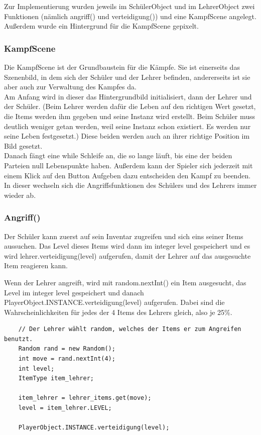 Zur Implementierung wurden jeweils im SchülerObject und im LehrerObject zwei Funktionen (nämlich angriff() und verteidigung()) und eine KampfScene angelegt.\\
Außerdem wurde ein Hintergrund für die KampfScene gepixelt.\\

\subsubsection{KampfScene}

Die KampfScene ist der Grundbaustein für die Kämpfe. Sie ist einerseits das Szenenbild, in dem sich der Schüler und der Lehrer befinden, andererseits ist sie aber auch zur Verwaltung des Kampfes da.\\
Am Anfang wird in dieser das Hintergrundbild initialisiert, dann der Lehrer und der Schüler. (Beim Lehrer werden dafür die Leben auf den richtigen Wert gesetzt, die Items werden ihm gegeben und seine Instanz wird erstellt. Beim Schüler muss deutlich weniger getan werden, weil seine Instanz schon existiert. Es werden nur seine Leben festgesetzt.) Diese beiden werden auch an ihrer richtige Position im Bild gesetzt.\\
Danach fängt eine while Schleife an, die so lange läuft, bis eine der beiden Parteien null Lebenspunkte haben. Außerdem kann der Spieler sich jederzeit mit einem Klick auf den Button \glqq Aufgeben \grqq dazu entscheiden den Kampf zu beenden.\\
In dieser wechseln sich die Angriffsfunktionen des Schülers und des Lehrers immer wieder ab.

\subsubsection{Angriff()}

Der Schüler kann zuerst auf sein Inventar zugreifen und sich eins seiner Items aussuchen. Das Level dieses Items wird dann im integer level gespeichert und es wird lehrer.verteidigung(level) aufgerufen, damit der Lehrer auf das ausgesuchte Item reagieren kann.\par
Wenn der Lehrer angreift, wird mit random.nextInt() ein Item ausgesucht, das Level im integer level gespeichert und danach PlayerObject.INSTANCE.verteidigung(level) aufgerufen. Dabei sind die Wahrscheinlichkeiten für jedes der 4 Items des Lehrers gleich, also je 25\%.
\begin{lstlisting}
	// Der Lehrer wählt random, welches der Items er zum Angreifen benutzt. 
	Random rand = new Random();
	int move = rand.nextInt(4);
	int level;
	ItemType item_lehrer;
	
	item_lehrer = lehrer_items.get(move);
	level = item_lehrer.LEVEL;
	
	PlayerObject.INSTANCE.verteidigung(level);
\end{lstlisting}


